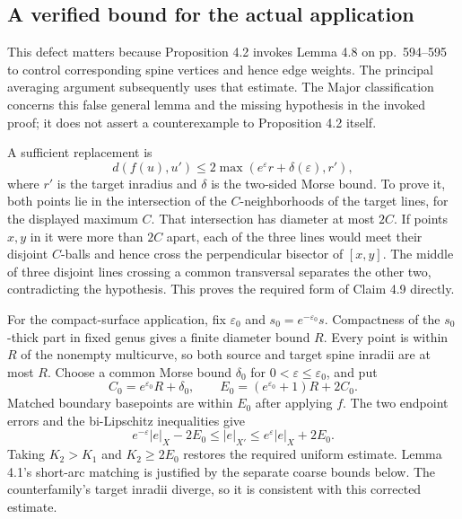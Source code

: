 \documentclass[10pt]{article}
\begin{document}
\subsection*{A verified bound for the actual application}
This defect matters because Proposition 4.2 invokes Lemma 4.8 on pp. 594–595 to control corresponding spine vertices and hence edge weights. The principal averaging argument subsequently uses that estimate. The Major classification concerns this false general lemma and the missing hypothesis in the invoked proof; it does not assert a counterexample to Proposition 4.2 itself.\par
A sufficient replacement is \[d(f(u),u')\le
 2\max(e^\varepsilon r+\delta(\varepsilon),r'),\] where \(r'\) is the target inradius and \(\delta\) is the two-sided Morse bound. To prove it, both points lie in the intersection of the \(C\)-neighborhoods of the target lines, for the displayed maximum \(C\). That intersection has diameter at most \(2C\). If points \(x,y\) in it were more than \(2C\) apart, each of the three lines would meet their disjoint \(C\)-balls and hence cross the perpendicular bisector of \([x,y]\). The middle of three disjoint lines crossing a common transversal separates the other two, contradicting the hypothesis. This proves the required form of Claim 4.9 directly.\par
For the compact-surface application, fix \(\varepsilon_0\) and \(s_0=e^{-\varepsilon_0}s\). Compactness of the \(s_0\)-thick part in fixed genus gives a finite diameter bound \(R\). Every point is within \(R\) of the nonempty multicurve, so both source and target spine inradii are at most \(R\). Choose a common Morse bound \(\delta_0\) for \(0<\varepsilon\le\varepsilon_0\), and put \[C_0=e^{\varepsilon_0}R+\delta_0,\qquad
 E_0=(e^{\varepsilon_0}+1)R+2C_0 .\] Matched boundary basepoints are within \(E_0\) after applying \(f\). The two endpoint errors and the bi-Lipschitz inequalities give \[e^{-\varepsilon}|e|_X-2E_0
 \le |e|_{X'}\le e^\varepsilon|e|_X+2E_0 .\] Taking \(K_2>\!K_1\) and \(K_2\ge2E_0\) restores the required uniform estimate. Lemma 4.1’s short-arc matching is justified by the separate coarse bounds below. The counterfamily’s target inradii diverge, so it is consistent with this corrected estimate.\par
\end{document}
